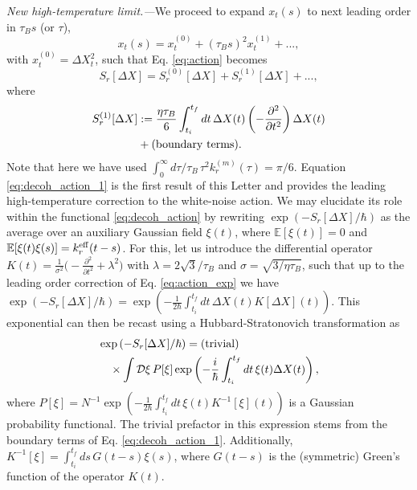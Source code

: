 \documentclass[prl,twocolumn,superscriptaddress,amsmath,amssymb]{revtex4-2}
\def\be{\begin{equation}}
\def\ee{\end{equation}}
\newcommand{\hb}{\hbar}
\begin{document}
{\it New high-temperature limit.---}We proceed to expand $x_{t}(s)$ to next leading order 
in $\tau_Bs$ (or $\tau$), 
\be\label{eq:x_expand}
    x_{t}(s) = x^{(0)}_{t} + (\tau_Bs)^2x^{(1)}_{t} + ...,
\ee
with $x^{(0)}_{t}=\Delta X^2_{t}$, such that Eq. \eqref{eq:action} becomes
\begin{equation}\label{eq:action_exp}
    S_r[\Delta X] = S^{(0)}_r[\Delta X] + S^{(1)}_r[\Delta X] + ...,
\end{equation}
where
\begin{align}\label{eq:decoh_action_1}
    S^{(1)}_r[\Delta X] &:= \frac{\eta\tau_B}{6}\int^{t_f}_{t_i}dt\,\Delta X(t)\left(-\frac{\partial^2}{\partial t^2}\right)\Delta X(t) \\
    &+ ({\rm boundary \,\, terms}). \nonumber
\end{align}
Note that here we have used $\int^{\infty}_0d\tau/\tau_B\,\tau^2k^{(m)}_r(\tau) = \pi/6$. Equation \eqref{eq:decoh_action_1} is the first result of this Letter and provides the leading high-temperature correction to the white-noise action. We may elucidate its role within the functional \eqref{eq:decoh_action} by rewriting $\exp(-S_r[\Delta X]/\hb)$ as the average over an auxiliary Gaussian field $\xi(t)$, where $\mathbb{E}[\xi(t)]=0$ and $\mathbb{E}[\xi(t)\xi(s)]=k^{\rm eff}_r(t-s)$. For this, let us introduce the differential operator $K(t)=\frac{1}{\sigma^2}\big(-\frac{\partial^2}{\partial t^2} + \lambda^2\big)$ with $\lambda=2\sqrt{3}/\tau_B$ and $\sigma=\sqrt{3/\eta\tau_B}$, such that up to the leading order correction of Eq. \eqref{eq:action_exp} we have $\exp(-S_r[\Delta X]/\hb) = \exp(-\frac{1}{2\hb}\int^{t_f}_{t_i}dt\,\Delta X(t)K[\Delta X](t))$. This exponential can then be recast using a Hubbard-Stratonovich transformation as \cite{StockburgerMak1999,Xu2023,Xu2025}
\begin{align}\label{eq:FV_trick}
	&\exp{(-S_r[\Delta X]/\hb)}=({\rm trivial})\nonumber\\
    &\quad\times\int \mathcal{D}\xi\,P[\xi]\exp\left(-\frac{i}{\hb}\int^{t_f}_{t_i}dt\,\xi(t)\Delta X(t)\right),
\end{align}
where $P[\xi] = N^{-1}\exp(-\frac{1}{2\hb}\int^{t_f}_{t_i}dt\,\xi(t)K^{-1}[\xi](t))$ is a Gaussian probability functional. The trivial prefactor in this expression stems from the boundary terms of Eq. \eqref{eq:decoh_action_1}. Additionally, $K^{-1}[\xi] = \int^{t_f}_{t_i}ds\,G(t-s)\xi(s)$, where $G(t-s)$ is the (symmetric) Green's function of the operator $K(t)$.
\end{document}
